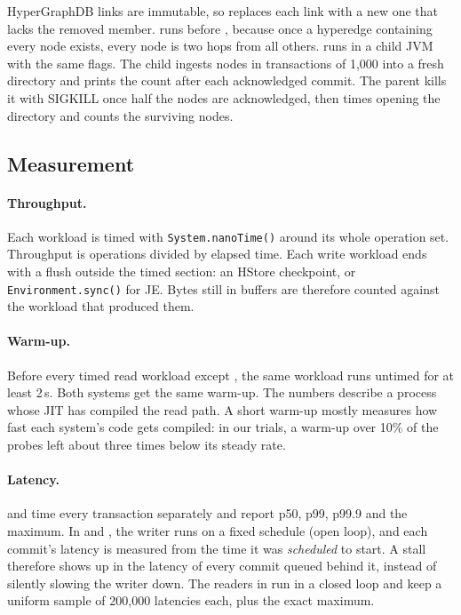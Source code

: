 HyperGraphDB links are immutable, so  replaces each link with a new one that lacks the removed member.  runs before , because once a hyperedge containing every node exists, every node is two hops from all others.  runs in a child JVM with the same flags. The child ingests nodes in transactions of 1,000 into a fresh directory and prints the count after each acknowledged commit. The parent kills it with SIGKILL once half the nodes are acknowledged, then times opening the directory and counts the surviving nodes.

\subsection{Measurement}
\label{sec:measurement}

\paragraph{Throughput.} Each workload is timed with \texttt{System.nanoTime()} around its whole operation set. Throughput is operations divided by elapsed time. Each write workload ends with a flush outside the timed section: an HStore checkpoint, or \texttt{Environment.sync()} for JE. Bytes still in buffers are therefore counted against the workload that produced them.

\paragraph{Warm-up.} Before every timed read workload except , the same workload runs untimed for at least 2\,s. Both systems get the same warm-up. The numbers describe a process whose JIT has compiled the read path. A short warm-up mostly measures how fast each system's code gets compiled: in our trials, a warm-up over 10\% of the probes left  about three times below its steady rate.

\paragraph{Latency.}  and  time every transaction separately and report p50, p99, p99.9 and the maximum. In  and , the writer runs on a fixed schedule (open loop), and each commit's latency is measured from the time it was \emph{scheduled} to start. A stall therefore shows up in the latency of every commit queued behind it, instead of silently slowing the writer down. The readers in  run in a closed loop and keep a uniform sample of 200,000 latencies each, plus the exact maximum.

